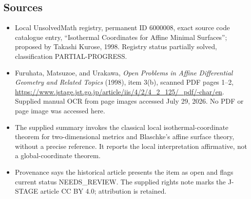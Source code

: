 \documentclass[11pt]{article}
\begin{document}
\subsection{Sources}
\begin{itemize}
\item Local UnsolvedMath registry, permanent ID 6000008, exact source code catalogue entry, ``Isothermal Coordinates for Affine Minimal Surfaces''; proposed by Takashi Kurose, 1998. Registry status partially solved, classification PARTIAL-PROGRESS.
\item Furuhata, Matsuzoe, and Urakawa, \emph{Open Problems in Affine Differential Geometry and Related Topics} (1998), item 3(b), scanned PDF pages 1--2, \url{https://www.jstage.jst.go.jp/article/iis/4/2/4_2_125/_pdf/-char/en}. Supplied manual OCR from page images accessed July 29, 2026. No PDF or page image was accessed here.
\item The supplied summary invokes the classical local isothermal-coordinate theorem for two-dimensional metrics and Blaschke's affine surface theory, without a precise reference. It reports the local interpretation affirmative, not a global-coordinate theorem.
\item Provenance says the historical article presents the item as open and flags current status NEEDS\_REVIEW. The supplied rights note marks the J-STAGE article CC BY 4.0; attribution is retained.
\end{itemize}
\end{document}
